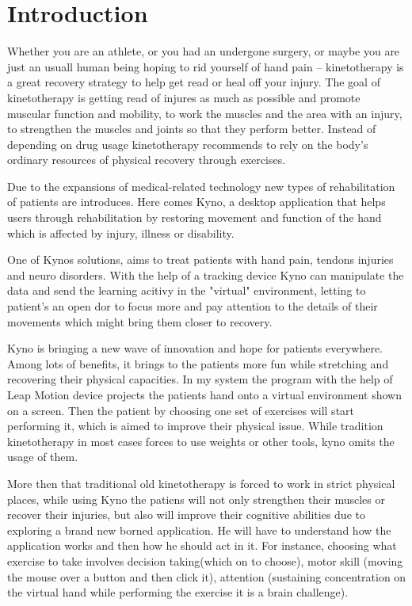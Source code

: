 \section*{Introduction}

Whether you are an athlete, or you had an undergone surgery, or maybe you are just an usuall human being hoping to rid yourself of hand pain -- kinetotherapy is a great recovery strategy to help get read or heal off your injury. The goal of kinetotherapy is getting read of injures as much as possible and promote muscular function and mobility, to work the muscles and the area with an injury, to strengthen the muscles and joints so that they perform better.
Instead of depending on drug usage kinetotherapy recommends to rely on the body's ordinary resources of physical recovery through exercises.

Due to the expansions of medical-related technology new types of rehabilitation of patients are introduces. Here comes Kyno, a desktop application that helps users through rehabilitation by restoring movement and function of the hand which is affected by injury, illness or disability.

One of Kynos solutions, aims to treat patients with hand pain, tendons injuries and neuro disorders. With the help of a tracking device Kyno can manipulate the data and send the learning acitivy in the "virtual" environment, letting to patient's an open dor to focus more and pay attention to the details of their movements which might bring them closer to recovery.

Kyno is bringing a new wave of innovation and hope for patients everywhere. Among lots of benefits, it brings to the patients more fun while stretching and recovering their physical capacities. In my system the program with the help of Leap Motion device projects the patients hand onto a virtual environment shown on a screen. Then the patient by choosing one set of exercises will start performing it, which is aimed to improve their physical issue. While tradition kinetotherapy in most cases forces to use weights or other tools, kyno omits the usage of them. 

More then that traditional old kinetotherapy is forced to work in strict physical places, while using Kyno the patiens will not only strengthen their muscles or recover their injuries, but also will improve their cognitive abilities due to exploring a brand new borned application. He will have to understand how the application works and then how he should act in it. For instance, choosing what exercise to take involves decision taking(which on to choose), motor skill (moving the mouse over a button and then click it), attention (sustaining concentration on the virtual hand while performing the exercise it is a brain challenge). 

